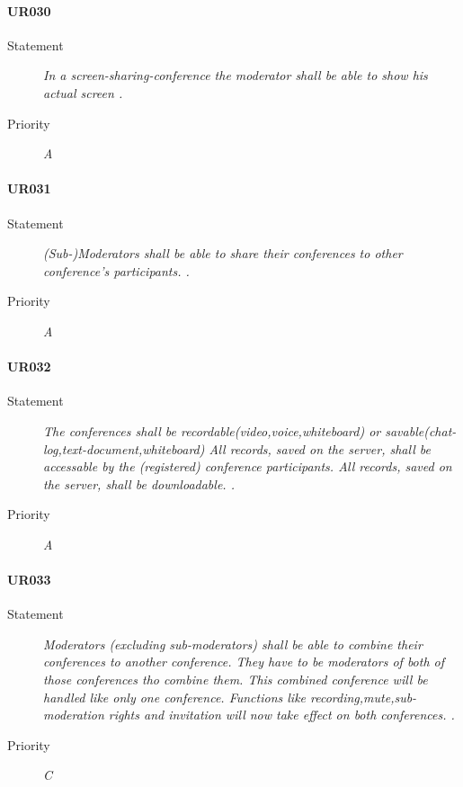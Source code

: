 \paragraph{UR030}
  \begin{description}
  \item [Statement] 
    \textit{ In a screen-sharing-conference the moderator shall be able to show his actual screen
    .}
  \item [Priority] \textit{A}
\end{description}
    
\paragraph{UR031}
  \begin{description}
  \item [Statement] 
    \textit{ (Sub-)Moderators shall be able to share their conferences to other conference's participants.
    .}
  \item [Priority] \textit{A}
\end{description}
    
\paragraph{UR032}
  \begin{description}
  \item [Statement] 
    \textit{ The conferences shall be recordable(video,voice,whiteboard) or savable(chat-log,text-document,whiteboard)
            All records, saved on the server, shall be accessable by the (registered) conference participants.
            All records, saved on the server, shall be downloadable.
    .}
  \item [Priority] \textit{A}
\end{description}
    
\paragraph{UR033}
  \begin{description}
  \item [Statement] 
    \textit{ Moderators (excluding sub-moderators) shall be able to combine their conferences to another conference.
            They have to be moderators of both of those conferences tho combine them.
            This combined conference will be handled like only one conference.
            Functions like recording,mute,sub-moderation rights and invitation will now take effect on both conferences.
    .}
  \item [Priority] \textit{C}
\end{description}

